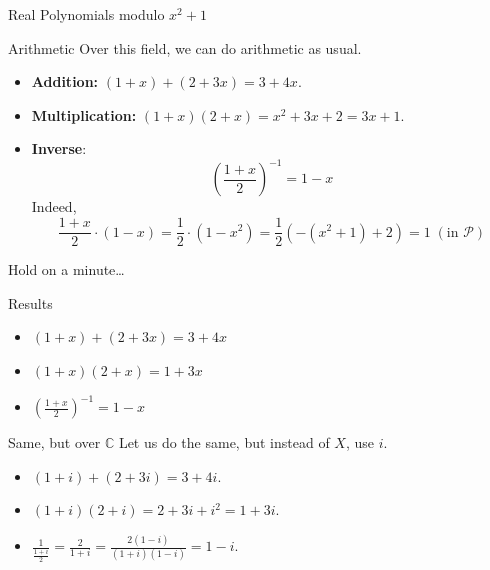 \documentclass{zkdl-presentation-template}
\begin{document}
    \begin{frame}{Real Polynomials modulo $x^2+1$}
        \begin{block}{Arithmetic}
            Over this field, we can do arithmetic as usual.
            \begin{itemize}
                \item \textbf{Addition:} $(1+x)+(2+3x)=3+4x$.
                \item \textbf{Multiplication:} $(1+x)(2+x)=x^2+3x+2=3x+1$.
                \item \textbf{Inverse}:
                \begin{equation*}
                    \left(\frac{1+x}{2}\right)^{-1} = 1-x
                \end{equation*} 
                Indeed,
                \begin{equation*}
                    \frac{1+x}{2} \cdot (1-x) = \frac{1}{2}\cdot (1-x^2) = \frac{1}{2}\left(-(x^2+1) + 2\right) = 1 \; (\text{in $\mathcal{P}$})
                \end{equation*}
            \end{itemize}
        \end{block}
    \end{frame}

    \begin{frame}{Hold on a minute\ldots}
        \begin{block}{Results}
            \begin{itemize}
                \item $(1+x)+(2+3x)=3+4x$
                \item $(1+x)(2+x)=1+3x$
                \item $\left(\frac{1+x}{2}\right)^{-1} = 1-x$
            \end{itemize}
        \end{block}
        
        \begin{block}{Same, but over $\mathbb{C}$}
            Let us do the same, but instead of $X$, use $i$.
            \begin{itemize}
                \item $(1+i)+(2+3i)=3+4i$.
                \item $(1+i)(2+i)=2+3i+i^2=1+3i$.
                \item $\frac{1}{\frac{1+i}{2}} = \frac{2}{1+i} = \frac{2(1-i)}{(1+i)(1-i)} = 1-i$.
            \end{itemize}
        \end{block}
    \end{frame}
\end{document}
